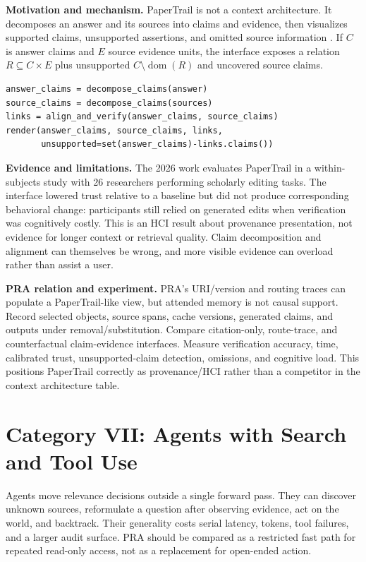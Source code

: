 \textbf{Motivation and mechanism.} PaperTrail is not a context architecture.  It decomposes
an answer and its sources into claims and evidence, then visualizes supported claims,
unsupported assertions, and omitted source information \citep{martinboyle2026papertrail}.
If $C$ is answer claims and $E$ source evidence units, the interface exposes a relation
$R\subseteq C\times E$ plus unsupported $C\setminus\operatorname{dom}(R)$ and uncovered
source claims.

\begin{lstlisting}[caption={Claim--evidence audit pipeline}]
answer_claims = decompose_claims(answer)
source_claims = decompose_claims(sources)
links = align_and_verify(answer_claims, source_claims)
render(answer_claims, source_claims, links,
       unsupported=set(answer_claims)-links.claims())
\end{lstlisting}

\textbf{Evidence and limitations.} The 2026 work evaluates PaperTrail in a within-subjects
study with 26 researchers performing scholarly editing tasks.  The interface lowered trust
relative to a baseline but did not produce corresponding behavioral change: participants
still relied on generated edits when verification was cognitively costly.  This is an HCI
result about provenance presentation, not evidence for longer context or retrieval quality.
Claim decomposition and alignment can themselves be wrong, and more visible evidence can
overload rather than assist a user.

\textbf{PRA relation and experiment.} PRA's URI/version and routing traces can populate a
PaperTrail-like view, but attended memory is not causal support.  Record selected objects,
source spans, cache versions, generated claims, and outputs under removal/substitution.
Compare citation-only, route-trace, and counterfactual claim-evidence interfaces.  Measure
verification accuracy, time, calibrated trust, unsupported-claim detection, omissions, and
cognitive load.  This positions PaperTrail correctly as provenance/HCI rather than a
competitor in the context architecture table.

\section{Category VII: Agents with Search and Tool Use}

Agents move relevance decisions outside a single forward pass.  They can discover unknown
sources, reformulate a question after observing evidence, act on the world, and backtrack.
Their generality costs serial latency, tokens, tool failures, and a larger audit surface.
PRA should be compared as a restricted fast path for repeated read-only access, not as a
replacement for open-ended action.

